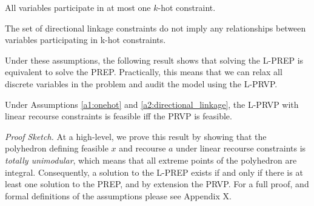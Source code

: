 \begin{assumption} 
All variables participate in at most one $k$-hot constraint.
\end{assumption}

\begin{assumption} 
The set of directional linkage constraints do not imply any relationships between variables participating in k-hot constraints.
\end{assumption}

Under these assumptions, the following result shows that solving the L-PREP is equivalent to solve the PREP. Practically, this means that we can relax all discrete variables in the problem and audit the model using the L-PRVP. 

\begin{theorem}\label{thm:tum}
Under Assumptions \ref{a1:onehot} and \ref{a2:directional_linkage}, the L-PRVP with linear recourse constraints is feasible iff the PRVP is feasible.
\end{theorem}

\textit{Proof Sketch.} At a high-level, we prove this result by showing that the polyhedron defining feasible $x$ and recourse $a$ under linear recourse constraints is \emph{totally unimodular}, which means that all extreme points of the polyhedron are integral. Consequently, a solution to the L-PREP exists if and only if there is at least one solution to the PREP, and by extension the PRVP. For a full proof, and formal definitions of the assumptions please see Appendix X.


